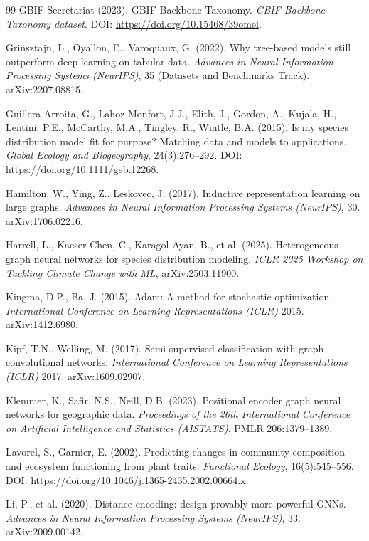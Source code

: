 \documentclass[a4paper,fleqn]{cas-sc}
\begin{document}
\begin{thebibliography}{99}
 GBIF Secretariat (2023). GBIF Backbone Taxonomy. \textit{GBIF Backbone Taxonomy dataset}. DOI: \url{https://doi.org/10.15468/39omei}.

 Grinsztajn, L., Oyallon, E., Varoquaux, G. (2022). Why tree-based models still outperform deep learning on tabular data. \textit{Advances in Neural Information Processing Systems (NeurIPS)}, 35 (Datasets and Benchmarks Track). arXiv:2207.08815.

 Guillera-Arroita, G., Lahoz-Monfort, J.J., Elith, J., Gordon, A., Kujala, H., Lentini, P.E., McCarthy, M.A., Tingley, R., Wintle, B.A. (2015). Is my species distribution model fit for purpose? Matching data and models to applications. \textit{Global Ecology and Biogeography}, 24(3):276--292. DOI: \url{https://doi.org/10.1111/geb.12268}.

 Hamilton, W., Ying, Z., Leskovec, J. (2017). Inductive representation learning on large graphs. \textit{Advances in Neural Information Processing Systems (NeurIPS)}, 30. arXiv:1706.02216.

 Harrell, L., Kaeser-Chen, C., Karagol Ayan, B., et al. (2025). Heterogeneous graph neural networks for species distribution modeling. \textit{ICLR 2025 Workshop on Tackling Climate Change with ML}, arXiv:2503.11900.

 Kingma, D.P., Ba, J. (2015). Adam: A method for stochastic optimization. \textit{International Conference on Learning Representations (ICLR)} 2015. arXiv:1412.6980.

 Kipf, T.N., Welling, M. (2017). Semi-supervised classification with graph convolutional networks. \textit{International Conference on Learning Representations (ICLR)} 2017. arXiv:1609.02907.

 Klemmer, K., Safir, N.S., Neill, D.B. (2023). Positional encoder graph neural networks for geographic data. \textit{Proceedings of the 26th International Conference on Artificial Intelligence and Statistics (AISTATS)}, PMLR 206:1379--1389.

 Lavorel, S., Garnier, E. (2002). Predicting changes in community composition and ecosystem functioning from plant traits. \textit{Functional Ecology}, 16(5):545--556. DOI: \url{https://doi.org/10.1046/j.1365-2435.2002.00664.x}.

 Li, P., et al. (2020). Distance encoding: design provably more powerful GNNs. \textit{Advances in Neural Information Processing Systems (NeurIPS)}, 33. arXiv:2009.00142.


\end{thebibliography}
\end{document}
